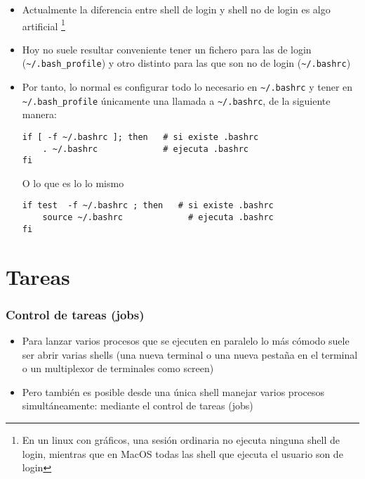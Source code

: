 \documentclass[ucs]{beamer}
\begin{document}
\begin{frame}[fragile]
\frametitle{}
\begin{itemize}
\item
Actualmente la diferencia entre shell de login y shell no de login
es algo artificial
\footnote{En un linux con gráficos, una sesión ordinaria no ejecuta
ninguna shell de login, mientras que en MacOS todas las shell 
que ejecuta el usuario
son de login}
\item
Hoy no suele resultar conveniente tener un fichero para
las de login (\verb|~/.bash_profile|) y otro distinto
para las que son no de login (\verb|~/.bashrc|)
\item
Por tanto, lo normal es configurar todo lo necesario en \verb|~/.bashrc|
y tener en \verb|~/.bash_profile| únicamente una llamada a \verb|~/.bashrc|, de la siguiente manera:


  \begin{footnotesize}
  \begin{verbatim}
if [ -f ~/.bashrc ]; then   # si existe .bashrc
    . ~/.bashrc             # ejecuta .bashrc
fi
  \end{verbatim}
  \end{footnotesize}
O lo que es lo lo mismo
  \begin{footnotesize}
  \begin{verbatim}
if test  -f ~/.bashrc ; then   # si existe .bashrc
    source ~/.bashrc             # ejecuta .bashrc
fi
  \end{verbatim}
  \end{footnotesize}

\end{itemize}

\end{frame}



\section{Tareas}
\begin{frame}[fragile]
\frametitle{Control de tareas (jobs)}


\begin{itemize}
\item
Para lanzar varios procesos que se ejecuten en paralelo lo más
cómodo suele ser abrir varias shells (una nueva terminal o una
nueva pestaña en el terminal o un multiplexor de terminales
como screen)

\item
Pero también es posible desde una única shell manejar varios
procesos simultáneamente: mediante el control de tareas (jobs)
\end{itemize}


\end{frame}
\end{document}

